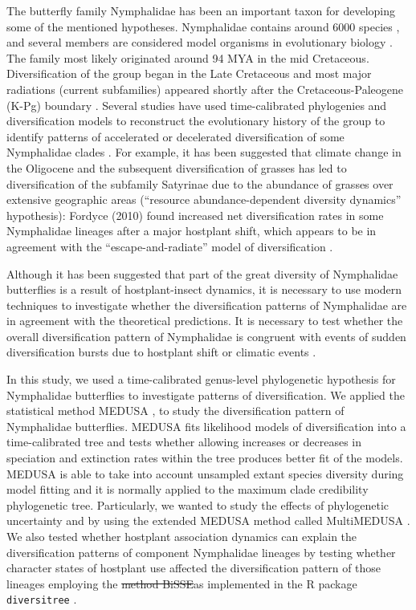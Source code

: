 \documentclass[10pt]{article}
\providecommand{\DIFaddtex}[1]{{\protect\color{blue}\uwave{#1}}} %
\providecommand{\DIFdeltex}[1]{{\protect\color{red}\sout{#1}}}                      %
\providecommand{\DIFaddbegin}{} %
\providecommand{\DIFaddend}{} %
\providecommand{\DIFdelbegin}{} %
\providecommand{\DIFdelend}{} %
\providecommand{\DIFadd}[1]{\texorpdfstring{\DIFaddtex{#1}}{#1}} %
\providecommand{\DIFdel}[1]{\texorpdfstring{\DIFdeltex{#1}}{}} %
\begin{document}
The butterfly family Nymphalidae has been an important taxon for
developing some of the mentioned hypotheses. Nymphalidae contains around
6000 species \cite{van_nieukerken2011}, and several members are considered model organisms
in evolutionary biology \cite{joron2006, willmott2006, brakefield2009}.
The family most likely originated
around 94 MYA in the mid Cretaceous. Diversification of the group began
in the Late Cretaceous and most major radiations (current subfamilies)
appeared shortly after the Cretaceous-Paleogene (K-Pg) boundary
\cite{heikkila2012}. Several studies have used time-calibrated phylogenies and
diversification models to reconstruct the evolutionary history of the
group to identify patterns of accelerated or decelerated diversification
of some Nymphalidae clades \cite{heikkila2012, elias2009, fordyce2010, wahlberg2009}.
For example, it has been
suggested that climate change in the Oligocene and the subsequent
diversification of grasses has led to diversification of the subfamily
Satyrinae \cite{pena2008} due to the abundance of grasses over extensive
geographic areas (``resource abundance-dependent diversity dynamics''
hypothesis): Fordyce (2010) \cite{fordyce2010} found increased net diversification
rates in some Nymphalidae lineages after a major hostplant shift, which
appears to be in agreement with the ``escape-and-radiate'' model of
diversification \cite{ehrlich1964}.

Although it has been suggested that part of the great diversity of
Nymphalidae butterflies is a result of hostplant-insect dynamics, it is
necessary to use modern techniques to investigate whether the
diversification patterns of Nymphalidae are in agreement with the
theoretical predictions. It is necessary to test whether the overall
diversification pattern of Nymphalidae is congruent with events of
sudden diversification bursts due to hostplant shift or climatic events
\cite{nylin2014, ferrer2013}.

In this study, we used a time-calibrated genus-level phylogenetic
hypothesis for Nymphalidae butterflies \cite{wahlberg2009} to investigate patterns
of diversification. We applied the statistical method MEDUSA
\cite{alfaro2009, harmon2011}, to study the diversification pattern of Nymphalidae
butterflies. MEDUSA fits likelihood models of diversification into a
time-calibrated tree and tests whether allowing increases or decreases
in speciation and extinction rates within the tree produces better fit
of the models. MEDUSA is able to take into account unsampled extant
species diversity during model fitting and it is normally applied to the
maximum clade credibility phylogenetic tree. Particularly, we wanted to
study the effects of phylogenetic uncertainty and by using the extended
MEDUSA method called MultiMEDUSA \cite{alfaro2009}. We also tested whether
hostplant association dynamics can explain the diversification patterns
of component Nymphalidae lineages by testing whether character states of
hostplant use affected the diversification pattern of those lineages
employing the \DIFdelbegin \DIFdel{method BiSSE}\DIFdelend \DIFaddbegin \DIFadd{binary speciation and extinction model (BiSSE) }\DIFaddend as
implemented in the R package \texttt{diversitree} \cite{fitzjohn2012}.
\end{document}
